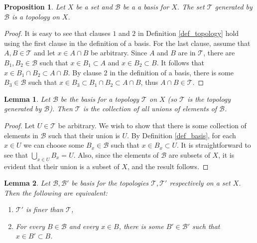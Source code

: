 \documentclass{report}
\newtheorem{lemma}{Lemma}[section]
\newtheorem{proposition}{Proposition}[section]
\theoremstyle{definition}
\theoremstyle{remark}
\newcommand{\prt}[1]{\mathcal{#1}}
\begin{document}
\begin{proposition}
    Let $X$ be a set and $\prt{B}$ be a a basis for $X$. The set $\prt{T}$ generated by $\prt{B}$ is a topology on $X$.
\end{proposition}

\begin{proof}
    It is easy to see that clauses $1$ and $2$ in Definition \ref{def_topology} hold using the first clause in the definition of a basis. For the last clause, assume that $A,B \in \prt{T}$ and let $x \in A \cap B$ be arbitrary. Since $A$ and $B$ are in $\prt{T}$, there are $B_1, B_2 \in \prt{B}$ such that $x \in B_1 \subset A$ and $x \in B_2 \subset B$. It follows that $x \in B_1 \cap B_2 \subset A \cap B$. By clause 2 in the definition of a basis, there is some $B_3 \in \prt{B}$ such that $x \in B_3 \subset B_1 \cap B_2 \subset A \cap B$, thus $A \cap B \in \prt{T}$.
\end{proof}

\begin{lemma} \label{lemma_basis_makes_topology}
    Let $\prt{B}$ be the basis for a topology $\prt{T}$ on $X$ (so $\prt{T}$ is the topology generated by $\prt{B}$). Then $\prt{T}$ is the collection of all unions of elements of $\prt{B}$.
\end{lemma}

\begin{proof}
    Let $U \in \prt{T}$ be arbitrary. We wish to show that there is some collection of elements in $\prt{B}$ such that their union is $U$. By Definition \ref{def_basis}, for each $x \in U$ we can choose some $B_x \in \prt{B}$ such that $x \in B_x \subset U$. It is straightforward to see that $\bigcup_{x \in U} B_x = U$. Also, since the elements of $\prt{B}$ are subsets of $X$, it is evident that their union is a subset of $X$, and the result follows.
\end{proof}

\begin{lemma} \label{lemma_finer_by_basis}
    Let $\prt{B}, \prt{B'}$ be basis for the topologies $\prt{T}, \prt{T'}$ respectively on a set $X$. Then the following are equivalent:
    
    \begin{enumerate}
        \item $\prt{T'}$ is finer than $\prt{T}$,
        \item For every $B \in \prt{B}$ and every $x \in B$, there is some $B' \in \prt{B'}$ such that $x \in B' \subset B$.
    \end{enumerate}
\end{lemma}
\end{document}
